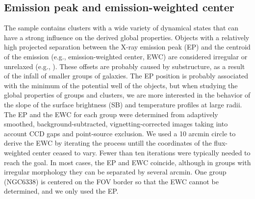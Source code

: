 \documentclass{aa} %
\begin{document}
\subsection{Emission peak and emission-weighted center}
The sample contains clusters with a wide variety of dynamical states
that can have a strong influence on the derived global properties.
Objects with a relatively high projected separation between the X-ray
emission peak (EP) and the centroid of the emission (e.g., emission-weighted center, EWC) are considered irregular or unrelaxed
(e.g., \citealt{1993ApJ...413..492M}).  These offsets are probably
caused by substructure, as a result of the infall of smaller groups of
galaxies. The EP position is probably associated with the minimum of
the potential well of the objects, but when studying the global
properties of groups and clusters, we are more interested in the
behavior of the slope of the surface brightness (SB) and temperature profiles at large
radii.  The EP and the EWC for each group were determined from
adaptively smoothed, background-subtracted, vignetting-corrected
images taking into account CCD gaps and point-source exclusion. We
used a 10 arcmin circle to derive the EWC by iterating the process
untill the coordinates of the flux-weighted center ceased to vary. Fewer than ten iterations were typically needed to reach the
goal. In most cases, the EP and EWC coincide, although in groups with
irregular morphology they can be separated by several arcmin. One
group (NGC6338) is centered on the FOV border so that the EWC cannot
be determined, and we only used the EP.
\end{document}
